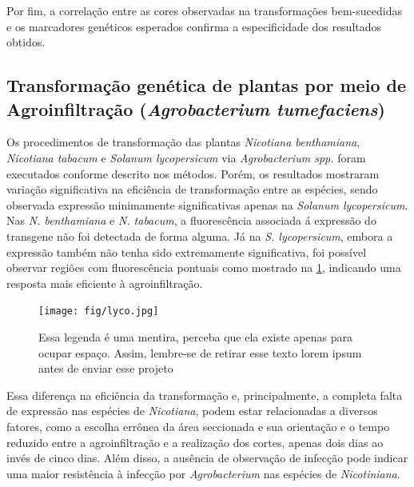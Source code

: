 Por fim, a correlação entre as cores observadas na transformações bem-sucedidas
e os marcadores genéticos esperados confirma a especificidade dos resultados
obtidos.

\subsection{Transformação genética de plantas por meio de Agroinfiltração (\textit{Agrobacterium tumefaciens})}
Os procedimentos de transformação das plantas \textit{Nicotiana benthamiana},
\textit{Nicotiana tabacum} e \textit{Solanum lycopersicum} via
\textit{Agrobacterium spp.} foram executados conforme descrito nos métodos.
Porém, os resultados mostraram variação significativa na eficiência de
transformação entre as espécies, sendo observada expressão minimamente
significativas apenas na \textit{Solanum lycopersicum}.  Nas \textit{N.
benthamiana} e \textit{N. tabacum}, a fluorescência associada á expressão do
transgene não foi detectada de forma alguma. Já na \textit{S.  lycopersicum},
embora a expressão também não tenha sido extremamente significativa, foi
possível observar regiões com fluorescência pontuais como mostrado na
\cref{lyco}, indicando uma resposta mais eficiente à agroinfiltração.

\begin{figure}
    \centering
    \texttt{[image: fig/lyco.jpg]}
    \caption{Essa legenda é uma mentira, perceba que ela existe apenas para
    ocupar espaço. Assim, lembre-se de retirar esse texto lorem ipsum antes de
enviar esse projeto} %
    \label{lyco}
\end{figure}

Essa diferença na eficiência da transformação e, principalmente, a completa
falta de expressão nas espécies de \textit{Nicotiana}, podem estar relacionadas a
diversos fatores, como a escolha errônea da área seccionada e sua orientação e o
tempo reduzido entre a agroinfiltração e a realização dos cortes, apenas dois
dias ao invés de cinco dias. Além disso, a ausência de observação de infecção pode indicar uma maior resistência à infecção
por \textit{Agrobacterium} nas espécies de \textit{Nicotiniana}.

